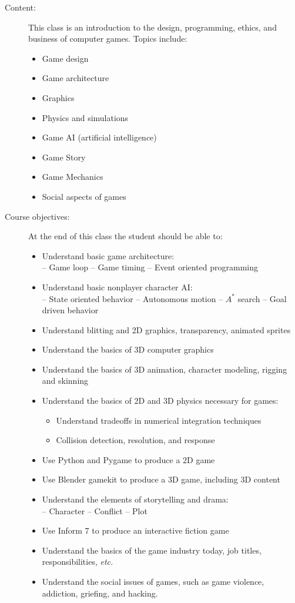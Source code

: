 \documentclass{article}
\begin{document}
\begin{description}
\item
[Content:]
This class is an introduction to the design, programming, ethics,
and business
of computer games.  Topics include:
\begin{multicols}{2}
  \begin{itemize}
\item Game design
  \item
 Game architecture
  \item
 Graphics
  \item
 Physics and simulations
  \item
 Game AI (artificial intelligence)
  \item
 Game Story
 \item Game Mechanics
  \item
 Social aspects of games
  \end{itemize}
\end{multicols}
\item
[Course objectives:]
At the end of this class the student should be able to:
  \begin{itemize}
  \item Understand basic game architecture:
\\
-- Game loop\hfill
-- Game timing\hfill
-- Event oriented programming\hfill\mbox{}
  \item Understand basic nonplayer character AI:
\\
-- State oriented behavior\hfill
-- Autonomous motion\hfill
-- $A^*$ search\hfill
-- Goal driven behavior\hfill\mbox{}
  \item Understand blitting and 2D graphics, transparency, animated sprites
  \item Understand the basics of 3D computer graphics
  \item Understand the basics of 3D animation, character modeling,
rigging and skinning
  \item Understand the basics of 2D and 3D physics necessary for games:
\begin{itemize}
  \item Understand tradeoffs in numerical integration techniques
  \item Collision detection, resolution, and response
\end{itemize}
  \item Use Python and Pygame to produce a 2D game
  \item Use Blender gamekit to produce a 3D game, including 3D content
  \item Understand the elements of storytelling and drama:\\
-- Character\hfill
-- Conflict\hfill
-- Plot\hfill\mbox{}
  \item Use Inform 7 to produce an interactive fiction game
  \item Understand the basics of the game industry today, job titles,
responsibilities, {\em etc.}
  \item Understand the social issues of games, such as
     game violence, addiction, griefing, and hacking.
  \end{itemize}



\end{description}
\end{document}
